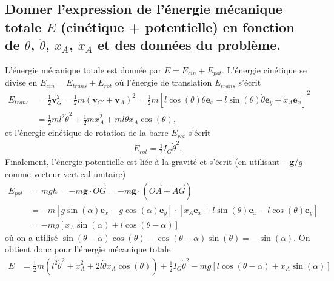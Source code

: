 \documentclass[11pt,a4paper]{exam}
\newcommand{\exACDH}{\bm e_x}
\newcommand{\eyACDH}{\bm e_y}
\begin{document}
\begin{parts}
\part{Donner l'expression de l'énergie mécanique totale $E$ (cinétique + potentielle) en fonction de $\theta$, $\dot\theta$, $x_A$, $\dot x_A$ et des données du problème.}
    \par\vspace{2mm}
    L'énergie mécanique totale est donnée par $E = E_{cin} + E_{pot}$.
    L'énergie cinétique se divise en $E_{cin} = E_{trans} + E_{rot}$ o\`u l'énergie de translation $E_{trans}$ s'écrit
    \begin{align}
        E_{trans} &= \frac{1}{2} \bm v_G^2 = \frac{1}{2} m (\bm v_{G'} + \bm v_{A})^2 = \frac{1}{2} m \left[l\cos(\theta)\dot\theta \exACDH + l\sin(\theta)\dot\theta \eyACDH + \dot x_A \exACDH\right]^2 \nonumber\\
        &=\frac{1}{2}ml^2\dot\theta^2 + \frac{1}{2}m\dot x_A^2 + ml\dot\theta \dot x_A \cos(\theta),
        \label{eq:Ecin}
    \end{align}
    et l'énergie cinétique de rotation de la barre $E_{rot}$ s'écrit
    \begin{align}
        E_{rot} = \frac{1}{2} I_G \dot\theta^2.
        \label{eq:Erot}
    \end{align}
    Finalement, l'énergie potentielle est liée à la gravité et s'écrit (en utilisant $-\bm g/g$ comme vecteur vertical unitaire)
    \begin{align}
        E_{pot} &= mgh = -m\bm g \cdot \overrightarrow{OG} =-m\bm g \cdot \left(\overrightarrow{OA}+\overrightarrow{AG}\right)\nonumber\\
        &= -m[g\sin(\alpha)\exACDH - g\cos(\alpha)\eyACDH] \cdot [x_A \exACDH +l\sin(\theta)\exACDH - l\cos(\theta)\eyACDH]\nonumber\\
        &= -mg [x_A\sin(\alpha) + l\cos(\theta-\alpha)]
        \label{eq:Epot}
    \end{align}
    o\`u on a utilisé $\sin(\theta-\alpha)\cos(\theta) - \cos(\theta-\alpha)\sin(\theta) = -\sin(\alpha)$.
    On obtient donc pour l'énergie mécanique totale
    \begin{align}
        E
        &=\frac{1}{2}m\left(l^2\dot\theta^2 + \dot x_A^2 + 2l\dot\theta \dot x_A \cos(\theta)\right) + \frac{1}{2} I_G \dot\theta^2 -mg\left[l\cos(\theta-\alpha) + x_A\sin(\alpha)\right]
        \label{eq:Emec}
    \end{align}

\end{parts}
\end{document}

